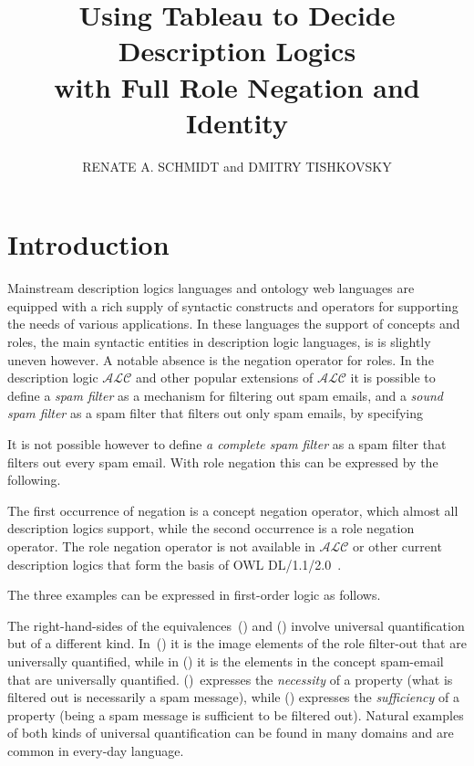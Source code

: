 \documentclass[leqno
,pdflatex
,prodmode
,acmtocl
]{acmsmall}
\title{Using Tableau to Decide Description Logics\\ with Full Role Negation and Identity}
\author{RENATE A. SCHMIDT and DMITRY TISHKOVSKY 
\affil{The University of Manchester, UK}}
\newcommand{\mathcmd}[1]{\ensuremath{#1}\xspace}
\newcommand{\dlfont}{\mathcal}
\newcommand{\dl}[1]{\mathcmd{\dlfont{#1}}}
\newcommand{\ALC}{\dl{ALC}}
\begin{document}
\maketitle

\section{Introduction}

Mainstream description logics languages and ontology web languages
are equipped with a rich supply of syntactic constructs and operators
for supporting the needs of various applications.
In these languages the support of concepts and roles, the main
syntactic entities in description logic languages, is 
is slightly uneven however. A notable absence is the negation operator for roles.
In the description logic \ALC and other popular extensions
of \ALC it is possible to define
a \emph{spam filter} as a mechanism for filtering
out spam emails, and
a \emph{sound spam filter} as a spam filter that
filters out only spam emails,
by specifying

It is not possible however to define \emph{a complete spam filter}
as a spam filter that filters out every spam email.
With role negation this can be expressed by the following. 
 
The first occurrence of negation is a concept negation operator, which
almost all description logics support, while the second occurrence is a
role negation operator.
The role negation operator is
not available in \ALC or other current description logics that form
the basis of OWL
DL/1.1/2.0~\cite{BaaderCalvaneseEtal03,owl,owl2}.

The three examples can be expressed in first-order logic as follows.
 
The right-hand-sides of the equivalences~() and () involve
universal quantification but of a different kind.
In~() it is the image elements of the role \textsf{filter-out}
that are universally quantified, while in () it is the
elements in the concept \textsf{spam-email} that are universally quantified.
()~expresses the \emph{necessity} of a property (what is
filtered out is necessarily a spam message), while ()
expresses the \emph{sufficiency} of a property (being a spam message
is sufficient to be filtered out).
Natural examples of both kinds of universal quantification can
be found in many domains and are common in every-day language.
\end{document}
